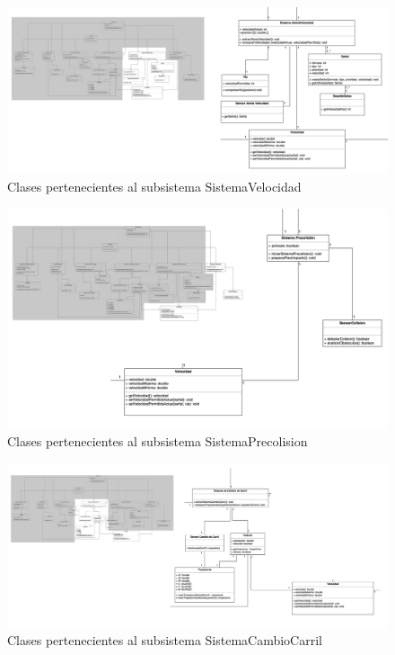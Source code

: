 \begin{figure}[h]
\begin{center}
\includegraphics[width=1\textwidth]{./img/SistemaVelocidad.png}
\end{center}
\caption{Clases pertenecientes al subsistema SistemaVelocidad}
\label{tab:c_SistemaVelocidadPNG}
\end{figure}

\begin{figure}[H]
\begin{center}
\includegraphics[width=1\textwidth]{./img/SistemaPrecolision.png}
\end{center}
\caption{Clases pertenecientes al subsistema SistemaPrecolision}
\label{tab:c_SistemaPrecolisionPNG}
\end{figure}



\begin{figure}[H]
\begin{center}
\includegraphics[width=1\textwidth]{./img/SistemaCambioCarril2.png}
\end{center}
\caption{Clases pertenecientes al subsistema SistemaCambioCarril}
\label{tab:c_SistemaCambioCarrilPNG}
\end{figure}




